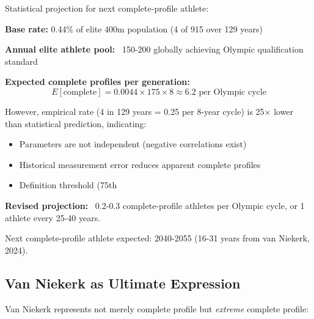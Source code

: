 Statistical projection for next complete-profile athlete:

\textbf{Base rate:} 0.44\% of elite 400m population (4 of 915 over 129 years)

\textbf{Annual elite athlete pool:} ~150-200 globally achieving Olympic qualification standard

\textbf{Expected complete profiles per generation:}
\begin{equation}
E[\text{complete}] = 0.0044 \times 175 \times 8 \approx 6.2 \text{ per Olympic cycle}
\end{equation}

However, empirical rate (4 in 129 years = 0.25 per 8-year cycle) is 25× lower than statistical prediction, indicating:
\begin{itemize}
    \item Parameters are not independent (negative correlations exist)
    \item Historical measurement error reduces apparent complete profiles
    \item Definition threshold (75th %
\end{itemize}

\textbf{Revised projection:} ~0.2-0.3 complete-profile athletes per Olympic cycle, or 1 athlete every 25-40 years.

Next complete-profile athlete expected: 2040-2055 (16-31 years from van Niekerk, 2024).

\subsection{Van Niekerk as Ultimate Expression}

Van Niekerk represents not merely complete profile but \textit{extreme} complete profile:

